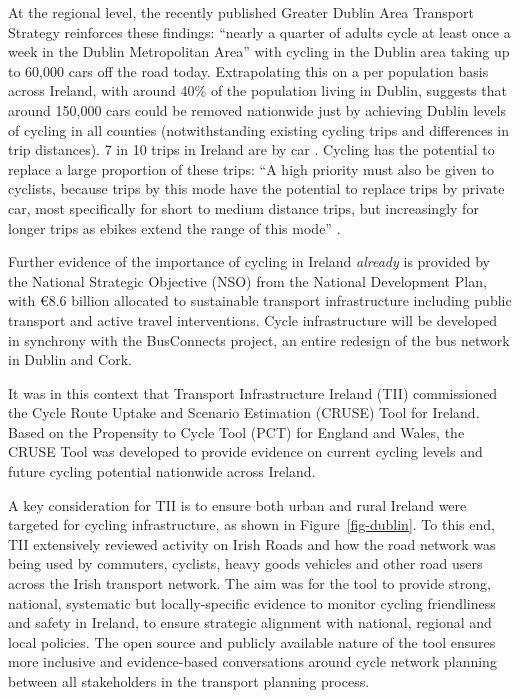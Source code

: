 \documentclass[
  super,
  preprint,
  3p]{elsarticle}
\begin{document}
At the regional level, the recently published Greater Dublin Area
Transport Strategy \citep{greater} reinforces these findings: ``nearly a
quarter of adults cycle at least once a week in the Dublin Metropolitan
Area'' with cycling in the Dublin area taking up to 60,000 cars off the
road today. Extrapolating this on a per population basis across Ireland,
with around 40\% of the population living in Dublin, suggests that
around 150,000 cars could be removed nationwide just by achieving Dublin
levels of cycling in all counties (notwithstanding existing cycling
trips and differences in trip distances). 7 in 10 trips in Ireland are
by car \citep{national} . Cycling has the potential to replace a large
proportion of these trips: ``A high priority must also be given to
cyclists, because trips by this mode have the potential to replace trips
by private car, most specifically for short to medium distance trips,
but increasingly for longer trips as ebikes extend the range of this
mode'' \citep{greater}.

Further evidence of the importance of cycling in Ireland \emph{already}
is provided by the National Strategic Objective (NSO) from the National
Development Plan, with €8.6 billion allocated to sustainable transport
infrastructure including public transport and active travel
interventions. Cycle infrastructure will be developed in synchrony with
the BusConnects project, an entire redesign of the bus network in Dublin
and Cork.

It was in this context that Transport Infrastructure Ireland (TII)
commissioned the Cycle Route Uptake and Scenario Estimation (CRUSE) Tool
for Ireland. Based on the Propensity to Cycle Tool (PCT) for England and
Wales, the CRUSE Tool was developed to provide evidence on current
cycling levels and future cycling potential nationwide across Ireland.

A key consideration for TII is to ensure both urban and rural Ireland
were targeted for cycling infrastructure, as shown in
Figure~\ref{fig-dublin}. To this end, TII extensively reviewed activity
on Irish Roads and how the road network was being used by commuters,
cyclists, heavy goods vehicles and other road users across the Irish
transport network. The aim was for the tool to provide strong, national,
systematic but locally-specific evidence to monitor cycling friendliness
and safety in Ireland, to ensure strategic alignment with national,
regional and local policies. The open source and publicly available
nature of the tool ensures more inclusive and evidence-based
conversations around cycle network planning between all stakeholders in
the transport planning process.
\end{document}
